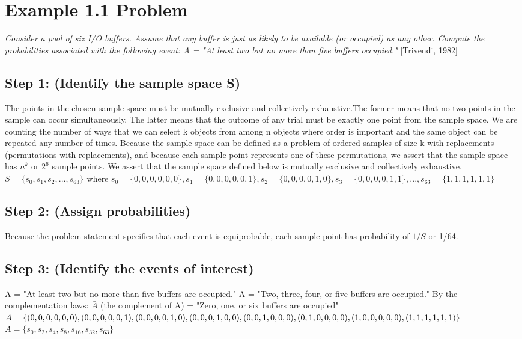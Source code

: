 \documentclass[a4paper,10pt]{article}
\title{}
\author{Mark Johnson \\
Loyola University Chicago}
\date {mjohnson4@luc.edu}
\begin{document}
\maketitle
\section{Example 1.1 Problem}
\emph{Consider a pool of siz I/O buffers. Assume that any buffer is just as likely to be available (or occupied) as 
any other. Compute the probabilities associated with the following event: \newline
A = "At least two but no more than five buffers occupied."} [Trivendi, 1982]
\subsection{Step 1: (Identify the sample space S)}
The points in the chosen sample space must be mutually exclusive and collectively exhaustive.The former means that no 
two points in the sample can occur simultaneously. The latter means that the outcome of any trial must be exactly one 
point from the sample space. We are counting the number of ways that we can select k objects from among n objects 
where order is important and the same object can be repeated any number of times. Because the sample space can be 
defined as a problem of ordered samples of size k with replacements (permutations with replacements), and because 
each sample point represents one of these permutations, we assert that the sample space has $ n^{k} $ or $ 2^{6} $ 
sample points. We assert that the sample space defined below is mutually exclusive and collectively exhaustive. 
\newline
$ S = \{s_{0}, s_{1}, s_{2},..., s_{63}\} $ where \newline
$ s_{0} = \{0,0,0,0,0,0\}, s_{1} = \{0,0,0,0,0,1\}, s_{2} = \{0,0,0,0,1,0\}, s_{3} = \{0,0,0,0,1,1\},..., s_{63} = 
\{1,1,1,1,1,1\} $
\subsection{Step 2: (Assign probabilities)}
Because the problem statement specifies that each event is equiprobable, each sample point has probability of $ 1/S $ 
or 1/64.
\subsection{Step 3: (Identify the events of interest)}
A = "At least two but no more than five buffers are occupied."
A = "Two, three, four, or five buffers are occupied."
By the complementation laws: \newline
$ \bar{A} $ (the complement of A) = "Zero, one, or six buffers are occupied"
$ \bar{A} = \{(0,0,0,0,0,0), (0,0,0,0,0,1), (0,0,0,0,1,0), \newline
 (0,0,0,1,0,0), (0,0,1,0,0,0), (0,1,0,0,0,0), (1,0,0,0,0,0), (1,1,1,1,1,1)\} $ \newline
$ \bar{A} = \{s_{0}, s_{2}, s_{4}, s_{8}, s_{16}, s_{32}, s_{63}\} $
\end{document}

